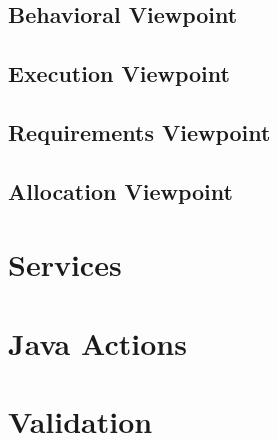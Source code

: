 \subsection{Behavioral Viewpoint}
\subsection{Execution Viewpoint}
\subsection{Requirements Viewpoint}
\subsection{Allocation Viewpoint}


\section{\label{sirius:services}Services}
\section{\label{sirius:java}Java Actions}
\section{\label{sirius:validation}Validation}
